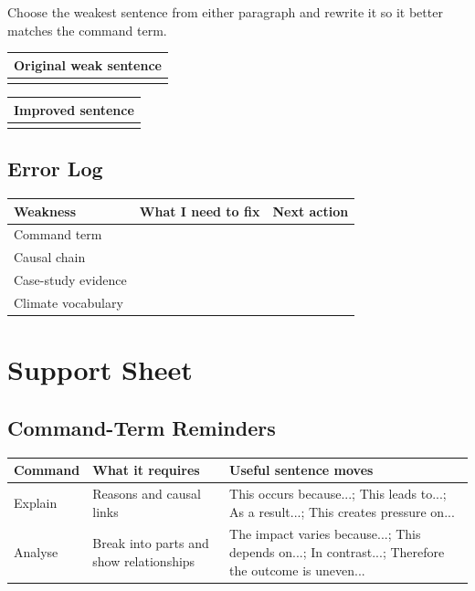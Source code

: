 \documentclass[11pt,a4paper]{article}
\begin{document}
Choose the weakest sentence from either paragraph and rewrite it so it better
matches the command term.

\begin{tabularx}{\textwidth}{Y}
\toprule
\textbf{Original weak sentence} \\
\midrule
\rule{0pt}{1.3cm} \\
\bottomrule
\end{tabularx}

\vspace{0.65em}

\begin{tabularx}{\textwidth}{Y}
\toprule
\textbf{Improved sentence} \\
\midrule
\rule{0pt}{1.3cm} \\
\bottomrule
\end{tabularx}

\subsection{Error Log}

\begin{tabularx}{\textwidth}{L{0.2\textwidth}Y Y}
\toprule
\textbf{Weakness} & \textbf{What I need to fix} & \textbf{Next action} \\
\midrule
Command term & & \\
Causal chain & & \\
Case-study evidence & & \\
Climate vocabulary & & \\
\bottomrule
\end{tabularx}

\newpage

\section{Support Sheet}

\subsection{Command-Term Reminders}

\begin{tabularx}{\textwidth}{L{0.18\textwidth}Y Y}
\toprule
\textbf{Command} & \textbf{What it requires} & \textbf{Useful sentence moves} \\
\midrule
Explain & Reasons and causal links & This occurs because...; This leads to...;
As a result...; This creates pressure on... \\
Analyse & Break into parts and show relationships & The impact varies because...;
This depends on...; In contrast...; Therefore the outcome is uneven... \\
\bottomrule
\end{tabularx}
\end{document}
